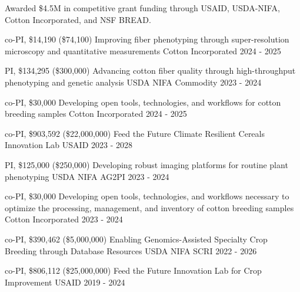 
  \cvsummarytext
    {Awarded \$4.5M in competitive grant funding through USAID, USDA-NIFA, Cotton Incorporated, and NSF BREAD.}

\begin{cvgrants}

  \cvgrant
    {co-PI, \$14,190 (\$74,100)}
    {Improving fiber phenotyping through super-resolution microscopy and quantitative measurements}
    {Cotton Incorporated} %
    {2024 - 2025}
    {
    }
  
  \cvgrant
    {PI, \$134,295 (\$300,000)}
    {Advancing cotton fiber quality through high-throughput phenotyping and genetic analysis}
    {USDA NIFA Commodity} %
    {2023 - 2024}
    {
    }

  \cvgrant
    {co-PI, \$30,000}
    {Developing open tools, technologies, and workflows for cotton breeding samples}
    {Cotton Incorporated} %
    {2024 - 2025}
    {
    }

  \cvgrant
    {co-PI, \$903,592 (\$22,000,000)}
    {Feed the Future Climate Resilient Cereals Innovation Lab}
    {USAID} %
    {2023 - 2028}
    {
    }

  \cvgrant
    {PI, \$125,000 (\$250,000)}
    {Developing robust imaging platforms for routine plant phenotyping}
    {USDA NIFA AG2PI} %
    {2023 - 2024}
    {
    }

  \cvgrant
    {co-PI, \$30,000}
    {Developing open tools, technologies, and workflows necessary to optimize the processing, management, and inventory of cotton breeding samples}
    {Cotton Incorporated} %
    {2023 - 2024}
    {
    }

  \cvgrant
    {co-PI, \$390,462 (\$5,000,000)}
    {Enabling Genomics-Assisted Specialty Crop Breeding through Database Resources}
    {USDA NIFA SCRI} %
    {2022 - 2026}
    {
    }

  \cvgrant
    {co-PI, \$806,112 (\$25,000,000)}
    {Feed the Future Innovation Lab for Crop Improvement}
    {USAID} %
    {2019 - 2024}
    {
    }


\end{cvgrants}
